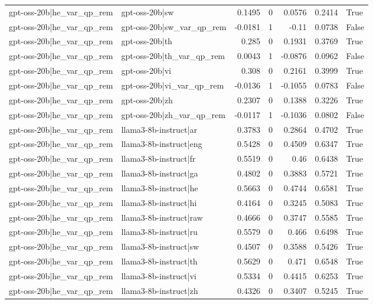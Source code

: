 \begin{table}
\begin{tabular}{l l r r r r l}
gpt-oss-20b|he_var_qp_rem & gpt-oss-20b|sw & 0.1495 & 0 & 0.0576 & 0.2414 & True \\
gpt-oss-20b|he_var_qp_rem & gpt-oss-20b|sw_var_qp_rem & -0.0181 & 1 & -0.11 & 0.0738 & False \\
gpt-oss-20b|he_var_qp_rem & gpt-oss-20b|th & 0.285 & 0 & 0.1931 & 0.3769 & True \\
gpt-oss-20b|he_var_qp_rem & gpt-oss-20b|th_var_qp_rem & 0.0043 & 1 & -0.0876 & 0.0962 & False \\
gpt-oss-20b|he_var_qp_rem & gpt-oss-20b|vi & 0.308 & 0 & 0.2161 & 0.3999 & True \\
gpt-oss-20b|he_var_qp_rem & gpt-oss-20b|vi_var_qp_rem & -0.0136 & 1 & -0.1055 & 0.0783 & False \\
gpt-oss-20b|he_var_qp_rem & gpt-oss-20b|zh & 0.2307 & 0 & 0.1388 & 0.3226 & True \\
gpt-oss-20b|he_var_qp_rem & gpt-oss-20b|zh_var_qp_rem & -0.0117 & 1 & -0.1036 & 0.0802 & False \\
gpt-oss-20b|he_var_qp_rem & llama3-8b-instruct|ar & 0.3783 & 0 & 0.2864 & 0.4702 & True \\
gpt-oss-20b|he_var_qp_rem & llama3-8b-instruct|eng & 0.5428 & 0 & 0.4509 & 0.6347 & True \\
gpt-oss-20b|he_var_qp_rem & llama3-8b-instruct|fr & 0.5519 & 0 & 0.46 & 0.6438 & True \\
gpt-oss-20b|he_var_qp_rem & llama3-8b-instruct|ga & 0.4802 & 0 & 0.3883 & 0.5721 & True \\
gpt-oss-20b|he_var_qp_rem & llama3-8b-instruct|he & 0.5663 & 0 & 0.4744 & 0.6581 & True \\
gpt-oss-20b|he_var_qp_rem & llama3-8b-instruct|hi & 0.4164 & 0 & 0.3245 & 0.5083 & True \\
gpt-oss-20b|he_var_qp_rem & llama3-8b-instruct|raw & 0.4666 & 0 & 0.3747 & 0.5585 & True \\
gpt-oss-20b|he_var_qp_rem & llama3-8b-instruct|ru & 0.5579 & 0 & 0.466 & 0.6498 & True \\
gpt-oss-20b|he_var_qp_rem & llama3-8b-instruct|sw & 0.4507 & 0 & 0.3588 & 0.5426 & True \\
gpt-oss-20b|he_var_qp_rem & llama3-8b-instruct|th & 0.5629 & 0 & 0.471 & 0.6548 & True \\
gpt-oss-20b|he_var_qp_rem & llama3-8b-instruct|vi & 0.5334 & 0 & 0.4415 & 0.6253 & True \\
gpt-oss-20b|he_var_qp_rem & llama3-8b-instruct|zh & 0.4326 & 0 & 0.3407 & 0.5245 & True \\

\end{tabular}
\end{table}
